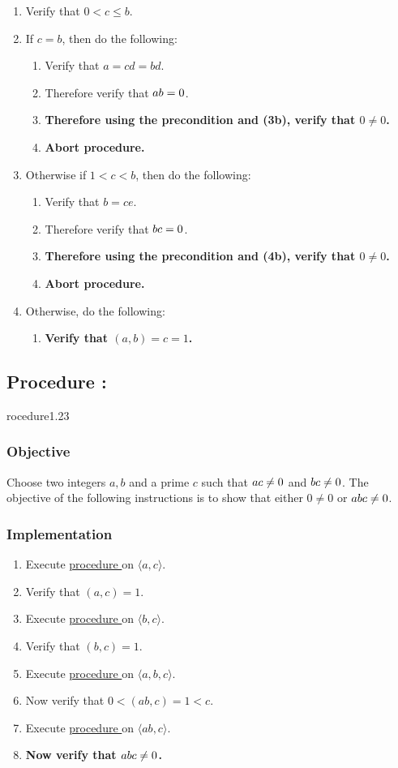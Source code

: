 \documentclass{article}
\let\mod\relax\DeclareMathOperator{\mod}{mod}
\newcounter{procedure}[part]
\newcommand{\procedure}[1]{\subsection*{Procedure \thepart:\theprocedure}\label{sec:procedure #1}\global\expandafter\edef\csname procedure#1\endcsname{\thepart:\theprocedure}\addtocounter{procedure}{1}}
\newcommand{\objective}{\subsubsection*{Objective}}
\newcommand{\implementation}{\subsubsection*{Implementation}}
\newcommand{\procedurehr}[1]{\hyperref[sec:procedure #1]{procedure \expandafter\csname procedure#1\endcsname}}
\begin{document}
\begin{multicols}{2}
\begin{enumerate}
					\item Verify that $0<c\le b$.
					\item If $c=b$, then do the following:
					\begin{enumerate}
						\item Verify that $a=cd=bd$.
						\item Therefore verify that $a\mod b=0$.
						\item \textbf{Therefore using the precondition and (3b), verify that $0\ne 0$.}
						\item \textbf{Abort procedure.}
					\end{enumerate}
					\item Otherwise if $1<c<b$, then do the following:
					\begin{enumerate}
						\item Verify that $b=ce$.
						\item Therefore verify that $b\mod c=0$.
						\item \textbf{Therefore using the precondition and (4b), verify that $0\ne 0$.}
						\item \textbf{Abort procedure.}
					\end{enumerate}
					\item Otherwise, do the following:
					\begin{enumerate}
						\item \textbf{Verify that $(a,b)=c=1$.}
					\end{enumerate}
				\end{enumerate}
		\procedure{1.23}
			\objective
				Choose two integers $a,b$ and a prime $c$ such that $a\mod c\ne 0$ and $b\mod c\ne 0$. The objective of the following instructions is to show that either $0\ne 0$ or $ab\mod c\ne 0$.
			\implementation
				\begin{enumerate}
					\item Execute \procedurehr{1.22} on $\langle a,c\rangle$.
					\item Verify that $(a,c)=1$.
					\item Execute \procedurehr{1.22} on $\langle b,c\rangle$.
					\item Verify that $(b,c)=1$.
					\item Execute \procedurehr{1.20} on $\langle a,b,c\rangle$.
					\item Now verify that $0<(ab,c)=1<c$.
					\item Execute \procedurehr{1.13} on $\langle ab,c\rangle$.
					\item \textbf{Now verify that $ab\mod c\ne 0$.}

\end{enumerate}
\end{multicols}
\end{document}
